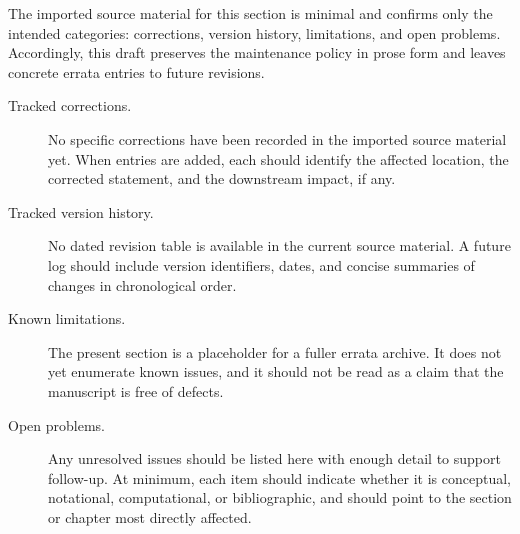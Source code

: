 The imported source material for this section is minimal and confirms only the intended categories: corrections, version history, limitations, and open problems. Accordingly, this draft preserves the maintenance policy in prose form and leaves concrete errata entries to future revisions.

\begin{description}
  \item[Tracked corrections.] No specific corrections have been recorded in the imported source material yet. When entries are added, each should identify the affected location, the corrected statement, and the downstream impact, if any.

  \item[Tracked version history.] No dated revision table is available in the current source material. A future log should include version identifiers, dates, and concise summaries of changes in chronological order.

  \item[Known limitations.] The present section is a placeholder for a fuller errata archive. It does not yet enumerate known issues, and it should not be read as a claim that the manuscript is free of defects.

  \item[Open problems.] Any unresolved issues should be listed here with enough detail to support follow-up. At minimum, each item should indicate whether it is conceptual, notational, computational, or bibliographic, and should point to the section or chapter most directly affected.
\end{description}

